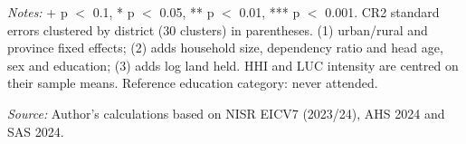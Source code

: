 \begin{table}[htbp]
\vspace{0.5em}
\begin{minipage}{\linewidth}
\footnotesize
\textit{Notes:} + p $<$ 0.1, * p $<$ 0.05, ** p $<$ 0.01, *** p $<$ 0.001. CR2 standard errors clustered by district (30 clusters) in parentheses. (1) urban/rural and province fixed effects; (2) adds household size, dependency ratio and head age, sex and education; (3) adds log land held. HHI and LUC intensity are centred on their sample means. Reference education category: never attended.

\textit{Source:} Author's calculations based on NISR EICV7 (2023/24), AHS 2024 and SAS 2024.
\end{minipage}
\end{table}
